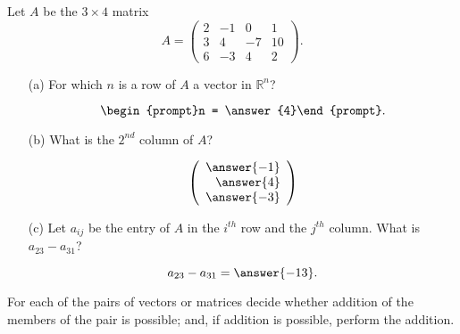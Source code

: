 \documentclass{ximera}
\begin{document}
\begin{exercise} \label{c1.1.2}
Let $A$ be the $3\times 4$ matrix
\[
A=\left(\begin{array}{rrrr} 2 & -1 & 0 & 1 \\ 3 & 4 & -7 & 10\\
        6 & -3 & 4 & 2 \end{array}\right).
\]
\begin{enumerate}
\item[(a)]  For which $n$ is a row of $A$ a vector in $\mathbb R^n$? 

\[\begin{prompt}n = \answer{4}\end{prompt}.\]
\item[(b)]  What is the $2^{nd}$ column of $A$?
  \begin{prompt}
    \[
      \left(\begin{array}{r} \answer{-1} \\ \answer{4} \\ \answer{-3} \end{array} \right)
    \]
  \end{prompt}
\item[(c)] Let $a_{ij}$ be the entry of $A$ in the $i^{th}$ row
  and the $j^{th}$ column.  What is $a_{23}-a_{31}$?
  \begin{prompt}
    \[
      a_{23}-a_{31} = \answer{-13}.
    \]
  \end{prompt}
\end{enumerate}

%
%
\end{exercise}





\problemlabel

\noindent For each of the pairs of vectors or matrices decide whether addition of the members of the pair is possible; and, if addition is possible, perform the addition.
\end{document}
